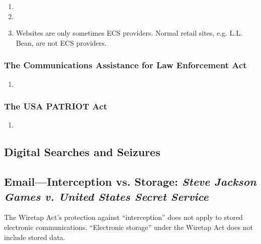 \begin{enumerate}
    \item %
    \item %
    \item Websites are only sometimes ECS providers. Normal retail sites, e.g. 
    L.L. Bean, are not ECS providers.
\end{enumerate}

\subsubsection{The Communications Assistance for Law Enforcement Act}

\begin{enumerate}
    \item %
\end{enumerate}

\subsubsection{The USA PATRIOT Act}

\begin{enumerate}
    \item %
\end{enumerate}

\subsection{Digital Searches and Seizures}

\subsection{Email---Interception vs. Storage: \emph{Steve Jackson Games v. 
United States Secret Service}}

The Wiretap Act's protection against ``interception'' does not apply to 
stored electronic communications. ``Electronic storage'' under the Wiretap Act 
does not include stored data.

